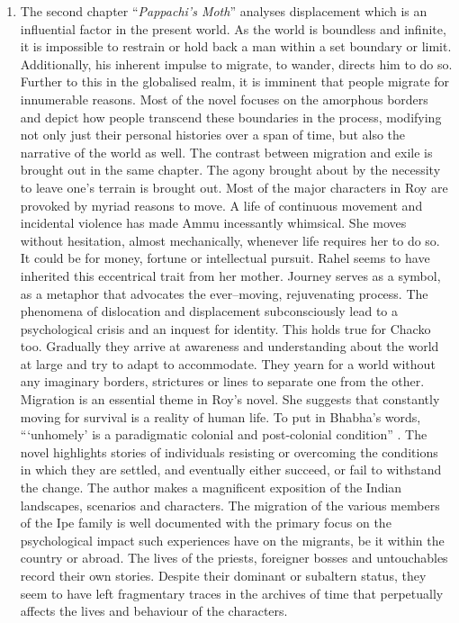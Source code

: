 \begin{enumerate}
  \item The second chapter ``\emph{Pappachi's Moth}'' analyses displacement which is an influential factor in the present world.  As the world is boundless and infinite, it is impossible to restrain or hold back a man within a set boundary or limit.  Additionally, his inherent impulse to migrate, to wander, directs him to do so.  Further to this in the globalised realm, it is imminent that people migrate for innumerable reasons.   Most of the novel focuses on the amorphous borders and depict how people transcend these boundaries in the process, modifying not only just their personal histories over a span of time, but also the narrative of the world as well.   The contrast between migration and exile is brought out in the same chapter. The agony brought about by the necessity to leave one's terrain is brought out.  Most of the major characters in Roy are provoked by myriad reasons to move.  A life of continuous movement and incidental violence has made Ammu incessantly whimsical.  She moves without hesitation, almost mechanically, whenever life requires her to do so. It could be for money, fortune or intellectual pursuit. Rahel seems to have inherited this eccentrical trait from her mother. Journey serves as a symbol, as a metaphor that advocates the ever–moving, rejuvenating process.   The phenomena of dislocation and displacement subconsciously lead to a psychological crisis and an inquest for identity.  This holds true for Chacko too. Gradually they arrive at awareness and understanding about the world at large and try to adapt to accommodate.  They yearn for a world without any imaginary borders, strictures or lines to separate one from the other.  Migration is an essential theme in Roy's novel.  She suggests that constantly moving for survival is a reality of human life.  To put in Bhabha's words, ```unhomely' is a paradigmatic colonial and post-colonial condition'' \parencite[13]{Bhabha1994}.  The novel highlights stories of individuals resisting or overcoming the conditions in which they are settled, and eventually either succeed, or fail to withstand the change.  The author makes a magnificent exposition of the Indian landscapes, scenarios and characters.  The migration of the various members of the Ipe family is well documented with the primary focus on the psychological impact such experiences have on the migrants, be it within the country or abroad.  The lives of the priests, foreigner bosses and untouchables record their own stories.  Despite their dominant or subaltern status, they seem to have left fragmentary traces in the archives of time that perpetually affects the lives and behaviour of the characters.


\end{enumerate}

